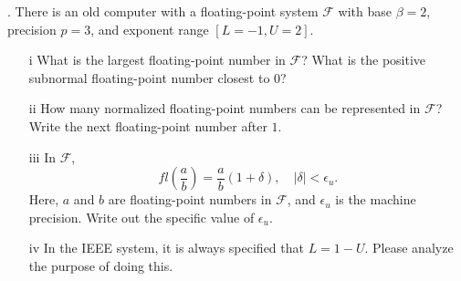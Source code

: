 \documentclass[a4paper]{ctexart}
\begin{document}
. There is an old computer with a floating-point system 
\( \mathcal{F} \) with base \( \beta = 2 \), precision \( p = 3 \), 
and exponent range \( [L = -1, U = 2] \).

\begin{enumerate}
    \item[i] What is the largest floating-point number in \( \mathcal{F} \)? 
    What is the positive subnormal floating-point number closest to $0$?
    \item[ii] How many normalized floating-point numbers can be represented 
    in \( \mathcal{F} \)? Write the next floating-point number after $1$.
    \item[iii] In \( \mathcal{F} \), 
    \[
        fl\left(\frac{a}{b}\right) = \frac{a}{b}(1 + \delta), 
        \quad |\delta| < \epsilon_u.
    \]
    Here, \( a \) and \( b \) are floating-point numbers in \( \mathcal{F} \), 
    and \( \epsilon_u \) is the machine precision. 
    Write out the specific value of \( \epsilon_u \).
    \item[iv] In the IEEE system, it is always specified that \( L = 1 - U \). 
    Please analyze the purpose of doing this.
\end{enumerate}





\end{document}

